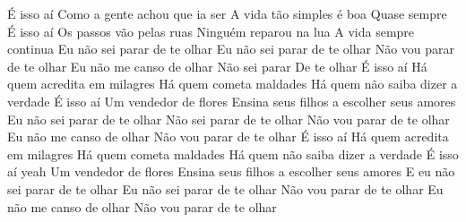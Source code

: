 \documentclass{article}
\begin{document}
	É isso aí
	Como a gente achou que ia ser
	A vida tão simples é boa
	Quase sempre
	É isso aí
	Os passos vão pelas ruas
	Ninguém reparou na lua
	A vida sempre continua
	Eu não sei parar de te olhar
	Eu não sei parar de te olhar
	Não vou parar de te olhar
	Eu não me canso de olhar
	Não sei parar
	De te olhar
	É isso aí
	Há quem acredita em milagres
	Há quem cometa maldades
	Há quem não saiba dizer a verdade
	É isso aí
	Um vendedor de flores
	Ensina seus filhos a escolher seus amores
	Eu não sei parar de te olhar
	Não sei parar de te olhar
	Não vou parar de te olhar
	Eu não me canso de olhar
	Não vou parar de te olhar
	É isso aí
	Há quem acredita em milagres
	Há quem cometa maldades
	Há quem não saiba dizer a verdade
	É isso aí yeah
	Um vendedor de flores
	Ensina seus filhos a escolher seus amores
	E eu não sei parar de te olhar
	Eu não sei parar de te olhar
	Não vou parar de te olhar
	Eu não me canso de olhar
	Não vou parar de te olhar
\end{document}
